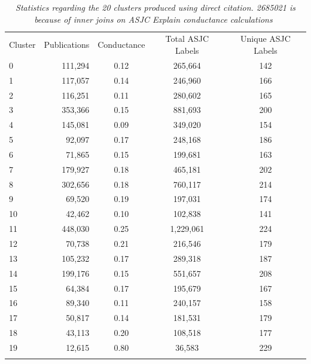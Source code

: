 \begin{table}
\caption{\emph{Statistics regarding the 20 clusters produced using direct citation.
2685021 is because of inner joins on ASJC Explain conductance calculations~\cite{shun_parallel_2016}}}
\label{tab:1}       %
\begin{tabular}{lrccc}
\hline\noalign{\smallskip}
Cluster & Publications & Conductance & Total ASJC Labels & Unique ASJC Labels\\
\noalign{\smallskip}\hline\noalign{\smallskip}
0 & 111,294 & 0.12 & 265,664 & 142 \\ 
1 & 117,057 & 0.14 & 246,960 & 166 \\ 
2 & 116,251 & 0.11 & 280,602 & 165 \\ 
3 & 353,366 & 0.15 & 881,693 & 200 \\ 
4 & 145,081 & 0.09 & 349,020 & 154 \\ 
5 & 92,097 & 0.17 & 248,168 & 186 \\ 
6 & 71,865 & 0.15 & 199,681 & 163 \\ 
7 & 179,927 & 0.18 & 465,181 & 202 \\ 
8 & 302,656 & 0.18 & 760,117 & 214 \\ 
9 & 69,520 & 0.19 & 197,031 & 174 \\ 
10 & 42,462 & 0.10 & 102,838 & 141 \\ 
11 & 448,030 & 0.25 & 1,229,061 & 224 \\ 
12 & 70,738 & 0.21 & 216,546 & 179 \\ 
13 & 105,232 & 0.17 & 289,318 & 187 \\ 
14 & 199,176 & 0.15 & 551,657 & 208 \\ 
15 & 64,384 & 0.17 & 195,679 & 167 \\ 
16 & 89,340 & 0.11 & 240,157 & 158 \\ 
17 & 50,817 & 0.14 & 181,531 & 179 \\ 
18 & 43,113 & 0.20 & 108,518 & 177 \\ 
19 & 12,615 & 0.80 & 36,583 & 229 \\ \noalign{\smallskip}\hline
\end{tabular}
\end{table}

